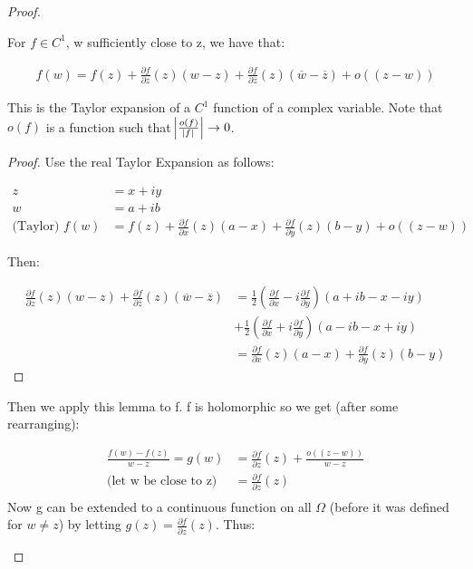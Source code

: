 \begin{proof}
\begin{enumerate}
    \begin{lemma}
    For $f \in C^1$, w sufficiently close to z, we have that:
    
    \begin{align*}
    f(w) = f(z) + \frac{\partial f}{ \partial z} (z) (w-z) + \frac{ \partial f}{ \partial \overline{z} } (z) (\overline{w}-\overline{z})+ o((z-w))
    \end{align*}
    
    This is the Taylor expansion of a $C^1$ function of a complex variable. Note that $o(f)$ is a function such that $\abs{\frac{o(f)}{\abs{f}}} \rightarrow 0$.
    \end{lemma}
    \begin{proof}
    Use the real Taylor Expansion as follows:
    
    
    
    \begin{align*}
        z&=x+iy\\
        w&=a+ib\\
        \text{(Taylor) } f(w) &= f(z) + \frac{\partial f }{\partial x}(z)(a-x)+ \frac{\partial f }{\partial y}(z)(b-y) +o((z-w))
    \end{align*}
    
    Then:
    
    \begin{align*}
        \frac{\partial f}{ \partial z} (z) (w-z) + \frac{ \partial f}{ \partial \overline{z} } (z) (\overline{w}-\overline{z}) &=  \frac{1}{2}\left( \frac{\partial f}{\partial x} - i\frac{\partial f}{\partial y}\right)(a+ib-x-iy)\\
        &+ \frac{1}{2}\left( \frac{\partial f}{\partial x} + i\frac{\partial f}{\partial y}\right)(a-ib-x+iy)\\
        &= \frac{\partial f }{\partial x}(z)(a-x)+ \frac{\partial f }{\partial y}(z)(b-y)
    \end{align*}
    \end{proof}
    
    Then we apply this lemma to f. f is holomorphic so we get (after some rearranging):
    
    \begin{align*}
        \frac{f(w)-f(z)}{w-z} = g(w) &= \frac{\partial f}{\partial z}(z) + \frac{o((z-w))}{w-z}\\
        \text{(let w be close to z) }&=\frac{\partial f}{\partial z}(z)\\
    \end{align*}
    Now g can be extended to a continuous function on all $\Omega$ (before it was defined for $w \neq z$) by letting $g(z) = \frac{\partial f}{\partial z}(z)$. Thus:
    

\end{enumerate}
\end{proof}
